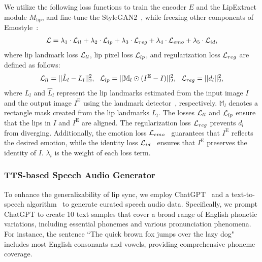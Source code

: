 We utilize the following loss functions to train the encoder $E$ and the LipExtract module $M_\text{lip}$, and fine-tune the StyleGAN2~\cite{karras2020analyzing}, while freezing other components of Emostyle~\cite{azari2024emostyle}:
\begin{eqnarray}
    \mathcal{L} = \lambda_1 \cdot \mathcal{L}_{ll} + \lambda_2 \cdot \mathcal{L}_{lp} + \lambda_3 \cdot \mathcal{L}_{reg} + \lambda_4 \cdot \mathcal{L}_{emo} + \lambda_5 \cdot \mathcal{L}_{id},
\end{eqnarray}
where lip landmark loss $\mathcal{L}_{ll}$, lip pixel loss $\mathcal{L}_{lp}$, and regularization loss $\mathcal{L}_{reg}$ are defined as follows:
\begin{eqnarray}
    \mathcal{L}_{ll} = ||\hat{L}_l-L_l||^2_2, \ \ \mathcal{L}_{lp} = ||\mathbb{M}_l \odot (I^\text{E}-I)||^2_2, \ \ \mathcal{L}_{reg} = || d_l ||^2_2,
\end{eqnarray}
where $L_l$ and $\hat{L}_l$ represent the lip landmarks estimated from the input image $I$ and the output image $I^\text{E}$ using the landmark detector~\cite{bulat2017far}, respectively. $\mathbb{M}_l$ denotes a rectangle mask created from the lip landmarks $L_l$. The losses $\mathcal{L}_{ll}$ and $\mathcal{L}_{lp}$ ensure that the lips in $I$ and $I^\text{E}$ are aligned. The regularization loss $\mathcal{L}_{reg}$ prevents $d_l$ from diverging. Additionally, the emotion loss $\mathcal{L}_{emo}$~\cite{azari2024emostyle} guarantees that $I^\text{E}$ reflects the desired emotion, while the identity loss $\mathcal{L}_{id}$~\cite{azari2024emostyle} ensures that $I^\text{E}$ preserves the identity of $I$. $\lambda_i$ is the weight of each loss term.

\subsubsection{TTS-based Speech Audio Generator}
\label{sec:audio generator}
To enhance the generalizability of lip sync, we employ ChatGPT~\cite{ChatGPT} and a text-to-speech algorithm~\cite{gTTS} to generate curated speech audio data. Specifically, we prompt ChatGPT to create 10 text samples that cover a broad range of English phonetic variations, including essential phonemes and various pronunciation phenomena. For instance, the sentence ``The quick brown fox jumps over the lazy dog" includes most English consonants and vowels, providing comprehensive phoneme coverage. 

